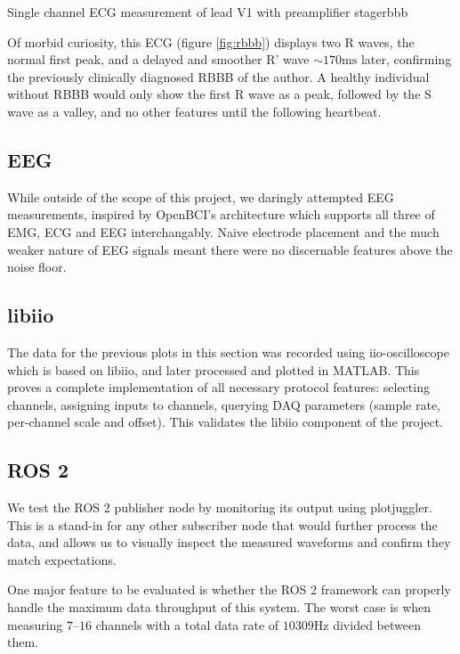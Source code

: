 \documentclass{thesis}
\newcommand{\Hz}{\unit{\hertz}}
\newcommand{\ms}{\unit{\milli\second}}
\begin{document}
\begin{thesisfigure}{Single channel ECG measurement of lead V1 with preamplifier stage}{rbbb}

\end{thesisfigure}

Of morbid curiosity, this ECG (figure \ref{fig:rbbb}) displays two R waves, the normal first peak, and a delayed and smoother R' wave $\sim 170\ms$ later, confirming the previously clinically diagnosed RBBB of the author. A healthy individual without RBBB would only show the first R wave as a peak, followed by the S wave as a valley, and no other features until the following heartbeat.

\subsection*{EEG}

While outside of the scope of this project, we daringly attempted EEG measurements, inspired by OpenBCI's architecture which supports all three of EMG, ECG and EEG interchangably. Naive electrode placement and the much weaker nature of EEG signals meant there were no discernable features above the noise floor.

\subsection*{libiio}

The data for the previous plots in this section was recorded using iio-oscilloscope\cite{osc} which is based on libiio, and later processed and plotted in MATLAB. This proves a complete implementation of all necessary protocol features: selecting channels, assigning inputs to channels, querying DAQ parameters (sample rate, per-channel scale and offset). This validates the libiio component of the project.

\subsection*{ROS 2}

We test the ROS 2 publisher node by monitoring its output using plotjuggler\cite{plotjug}. This is a stand-in for any other subscriber node that would further process the data, and allows us to visually inspect the measured waveforms and confirm they match expectations.

One major feature to be evaluated is whether the ROS 2 framework can properly handle the maximum data throughput of this system. The worst case is when measuring $\numrange{7}{16}$ channels with a total data rate of $10309\Hz$ divided between them.
\end{document}
